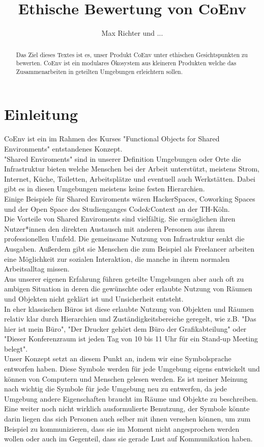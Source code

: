 \documentclass{article}
\title{Ethische Bewertung von CoEnv}
\author{Max Richter und ...}
\begin{document}
\maketitle

\begin{abstract}
Das Ziel dieses Textes ist es, unser Produkt CoEnv unter ethischen Gesichtspunkten zu bewerten. CoEnv ist ein modulares Ökosystem aus kleineren Produkten welche das Zusammenarbeiten in geteilten Umgebungen erleichtern sollen.
\end{abstract}

\newpage

\section{Einleitung}

CoEnv ist ein im Rahmen des Kurses "Functional Objects for Shared Environments" entstandenes Konzept.
\\[2ex]
"Shared Enviroments" sind in unserer Definition Umgebungen oder Orte die Infrastruktur bieten welche Menschen bei der Arbeit unterstützt, meistens Strom, Internet, Küche, Toiletten, Arbeitsplätze und eventuell auch Werkstätten. Dabei gibt es in diesen Umgebungen meistens keine festen Hierarchien.
\\[2ex]
Einige Beispiele für Shared Enviroments wären HackerSpaces, Coworking Spaces und der Open Space des Studienganges Code\&Context an der TH-Köln.
\\[2ex]
Die Vorteile von Shared Enviroments sind vielfältig. Sie ermöglichen ihren Nutzer*innen den direkten Austausch mit anderen Personen aus ihrem professionellen Umfeld. Die gemeinsame Nutzung von Infrastruktur senkt die Ausgaben. Außerdem gibt sie Menschen die zum Beispiel als Freelancer arbeiten eine Möglichkeit zur sozialen Interaktion, die manche in ihrem normalen Arbeitsalltag missen.
\\[2ex]
Aus unserer eigenen Erfahrung führen geteilte Umgebungen aber auch oft zu ambigen Situation in deren die gewünschte oder erlaubte Nutzung von Räumen und Objekten nicht geklärt ist und Unsicherheit entsteht.
\\[2ex]
In eher klassischen Büros ist diese erlaubte Nutzung von Objekten und Räumen relativ klar durch Hierarchien und Zuständigkeitsbereiche geregelt, wie z.B. "Das hier ist mein Büro", "Der Drucker gehört dem Büro der Grafikabteilung" oder "Dieser Konferenzraum ist jeden Tag von 10 bis 11 Uhr für ein Stand-up Meeting belegt".
\\[2ex]
Unser Konzept setzt an diesem Punkt an, indem wir eine Symbolsprache entworfen haben. Diese Symbole werden für jede Umgebung eigens entwickelt und können von Computern und Menschen gelesen werden. Es ist meiner Meinung nach wichtig die Symbole für jede Umgebung neu zu entwerfen, da jede Umgebung andere Eigenschaften braucht im Räume und Objekte zu beschreiben.
\\[2ex]
Eine weiter noch nicht wirklich ausformulierte Benutzung, der Symbole könnte darin liegen das sich Personen auch selber mit ihnen versehen können, um zum Beispiel zu kommunizieren, dass sie im Moment nicht angesprochen werden wollen oder auch im Gegenteil, dass sie gerade Lust auf Kommunikation haben. 
\end{document}
